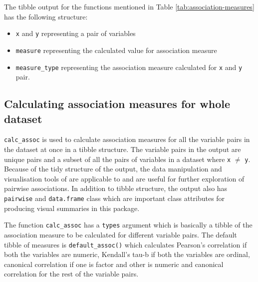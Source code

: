 The tibble output for the functions mentioned in Table
\ref{tab:association-measures} has the following structure:

\begin{itemize}
\tightlist
\item
  \texttt{x} and \texttt{y} representing a pair of variables
\item
  \texttt{measure} representing the calculated value for association
  measure
\item
  \texttt{measure\_type} representing the association measure calculated
  for \texttt{x} and \texttt{y} pair.
\end{itemize}

\hypertarget{calculating-association-measures-for-whole-dataset}{%
\subsection{Calculating association measures for whole
dataset}\label{calculating-association-measures-for-whole-dataset}}

\texttt{calc\_assoc} is used to calculate association measures for all
the variable pairs in the dataset at once in a tibble structure. The
variable pairs in the output are unique pairs and a subset of all the
pairs of variables in a dataset where \texttt{x} \(\neq\) \texttt{y}.
Because of the tidy structure of the output, the data manipulation and
visualisation tools of  \citep{tidyverse} are
applicable to and are useful for further exploration of pairwise
associations. In addition to tibble structure, the output also has
\texttt{pairwise} and \texttt{data.frame} class which are important
class attributes for producing visual summaries in this package.

The function \texttt{calc\_assoc} has a \texttt{types} argument which is
basically a tibble of the association measure to be calculated for
different variable pairs. The default tibble of measures is
\texttt{default\_assoc()} which calculates Pearson's correlation if both
the variables are numeric, Kendall's tau-b if both the variables are
ordinal, canonical correlation if one is factor and other is numeric and
canonical correlation for the rest of the variable pairs.

